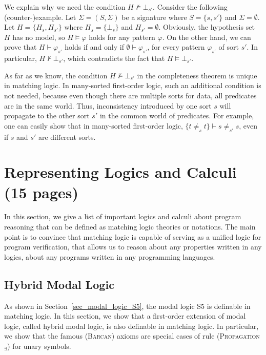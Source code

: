 \documentclass[letter,12pt]{article}
\newcommand{\sig}{{\Sigma}}
\newcommand{\prule}[1]{\textsc{(#1)}}
\newcommand{\propagationexists}{\prule{Propagation$_\exists$}\xspace}
\begin{document}
We explain why we need the condition
$H \not\vDash \bot_{s'}$.
Consider the following (counter-)example.
Let $\sig = (S,\Sigma)$ be a signature
where $S = \{s,s'\}$ and $\Sigma = \emptyset$.
Let $H = \{ H_s , H_{s'} \}$ where
$H_s = \{ \bot_s \}$ and $H_{s'} = \emptyset$.
Obviously, the hypothesis set $H$ has no model,
so $H \vDash \varphi$ holds for any pattern $\varphi$.
On the other hand,
we can prove that
$H \vdash \varphi_{s'}$ holds if and only if
$\emptyset \vdash \varphi_{s'}$,
for every pattern $\varphi_{s'}$ of sort $s'$.
In particular, $H \not\vdash \bot_{s'}$,
which contradicts the fact that
$H \vDash \bot_{s'}$.

As far as we know, the condition $H \not\vDash \bot_{s'}$
in the completeness theorem is unique in matching logic.
In many-sorted first-order logic,
such an additional condition is not needed, because even though
there are multiple sorts for data, all predicates are in the same world.
Thus, inconsistency introduced by one sort $s$ will propagate to the other sort $s'$
in the common world of predicates.
For example, one can easily show that in many-sorted first-order logic,
$\{ t \neq_s t \} \vdash s \neq_{s'} s$,
even if $s$ and $s'$ are different sorts.



\section{Representing Logics and Calculi (15 pages)}

In this section, we give a list of important logics and calculi about
program reasoning that can be defined as matching logic theories or notations.
The main point is to convince that matching logic is capable of
serving as a unified logic for program verification,
that allows us to reason about any properties written in any logics,
about any programs written in any programming languages.

\subsection{Hybrid Modal Logic}
\label{sec_hybrid_modal_logic}

As shown in Section~\ref{sec_modal_logic_S5},
the modal logic S5 is definable in matching logic.
In this section, we show that
a first-order extension of modal logic, called hybrid modal logic,
is also definable in matching logic.
In particular, we show that the famous \prule{Barcan} axioms are special cases
of rule \propagationexists for unary symbols.
\end{document}
